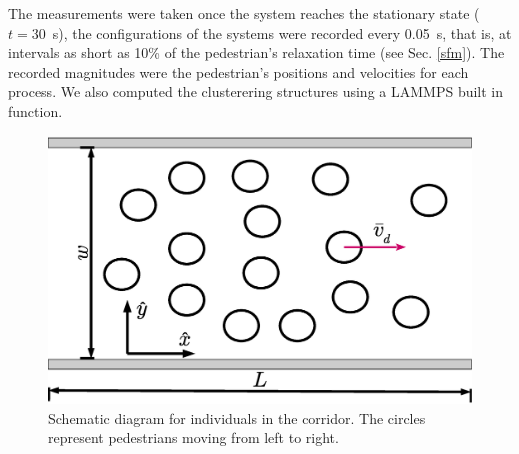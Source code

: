 The measurements were taken once the system reaches the stationary state ($t=30$~s), the configurations of the systems were recorded every 0.05~s, that is, at intervals as short as 10\% of the pedestrian’s relaxation time (see Sec. \ref{sfm}). The recorded magnitudes were the pedestrian’s positions and velocities for each process. We also computed the clusterering structures using a LAMMPS built in function.  



\begin{figure}[htbp!]
\includegraphics[width=\columnwidth]
{./plots/corridor.eps}
\caption{\label{pasillo} Schematic diagram for individuals in the corridor. 
The circles represent pedestrians moving from left to right. }
\end{figure}
